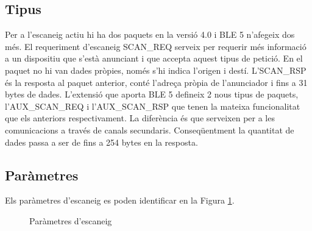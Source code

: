 \subsection{Tipus}
Per a l'escaneig actiu hi ha dos paquets en la versió 4.0 i BLE 5 n'afegeix dos més.
El requeriment d'escaneig SCAN\_REQ serveix per requerir més informació a un dispositiu que s'està anunciant i que accepta aquest tipus de petició.
En el paquet no hi van dades pròpies, només s'hi indica l'origen i destí.
L'SCAN\_RSP és la resposta al paquet anterior, conté l'adreça pròpia de l'anunciador i fins a 31 bytes de dades.
L'extensió que aporta BLE 5 defineix 2 nous tipus de paquets, l'AUX\_SCAN\_REQ i l'AUX\_SCAN\_RSP que tenen la mateixa funcionalitat que els anteriors respectivament.
La diferència és que serveixen per a les comunicacions a través de canals secundaris.
Conseqüentment la quantitat de dades passa a ser de fins a 254 bytes en la resposta.

\subsection{Paràmetres}
Els paràmetres d'escaneig es poden identificar en la Figura \ref{fig:escaneig_canals}.

\begin{figure}[!h]
	\begin{center}
		\begin{subfigmatrix}{1}
		\end{subfigmatrix}
	\end{center}
	\caption{Paràmetres d'escaneig \cite{advertisment_params} }
	\label{fig:escaneig_canals}
\end{figure}

